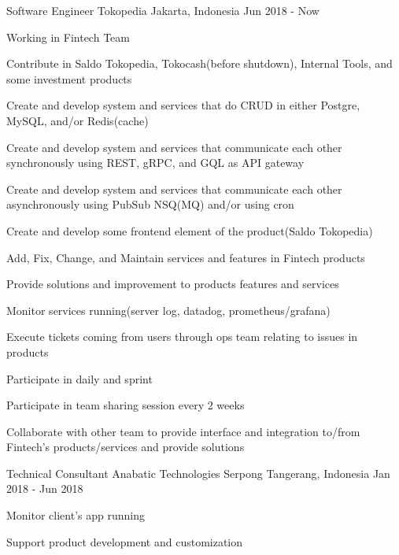 \begin{cventries}

\cventry
    {Software Engineer}
    {Tokopedia}
    {Jakarta, Indonesia}
    {Jun 2018 - Now}
    {
        \begin{cvitems}
            \item {Working in Fintech Team}
            \item {Contribute in Saldo Tokopedia, Tokocash(before shutdown), Internal Tools, and some investment products}
            \item {Create and develop system and services that do CRUD in either Postgre, MySQL, and/or Redis(cache)}
            \item {Create and develop system and services that communicate each other synchronously using REST, gRPC, and GQL as API gateway}
            \item {Create and develop system and services that communicate each other asynchronously using PubSub NSQ(MQ) and/or using cron}
            \item {Create and develop some frontend element of the product(Saldo Tokopedia)}
            \item {Add, Fix, Change, and Maintain services and features in Fintech products}
            \item {Provide solutions and improvement to products features and services}
            \item {Monitor services running(server log, datadog, prometheus/grafana)}
            \item {Execute tickets coming from users through ops team relating to issues in products}
            \item {Participate in daily and sprint}
            \item {Participate in team sharing session every 2 weeks}
            \item {Collaborate with other team to provide interface and integration to/from Fintech's products/services and provide solutions}
        \end{cvitems}
    }

\cventry
    {Technical Consultant}
    {Anabatic Technologies}
    {Serpong Tangerang, Indonesia}
    {Jan 2018 - Jun 2018}
    {
        \begin{cvitems}
            \item {Monitor client's app running}
            \item {Support product development and customization}
        \end{cvitems}
    }


\end{cventries}
